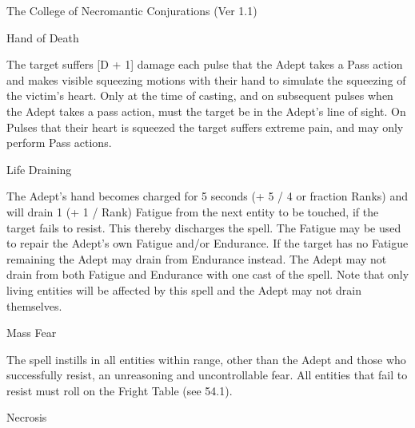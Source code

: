 \begin{Chapter}{The College of Necromantic Conjurations (Ver 1.1)}
\begin{spell}[S-6]{Hand of Death}

\begin{effects}
The target suffers [D + 1] damage each pulse that the Adept takes a
Pass action and makes visible squeezing motions with their hand to
simulate the squeezing of the victim’s heart. Only at the time of
casting, and on subsequent pulses when the Adept takes a pass action,
must the target be in the Adept’s line of sight.  On Pulses that their
heart is squeezed the target suffers extreme pain, and may only
perform Pass actions.
\end{effects}
\end{spell}

\begin{spell}[S-7]{Life Draining}

\begin{effects}
The Adept’s hand becomes charged for 5 seconds (+ 5 / 4 or fraction
Ranks) and will drain 1 (+ 1 / Rank) Fatigue from the next entity to
be touched, if the target fails to resist.  This thereby discharges
the spell.  The Fatigue may be used to repair the Adept’s own Fatigue
and/or Endurance.  If the target has no Fatigue remaining the Adept
may drain from Endurance instead. The Adept may not drain from both
Fatigue and Endurance with one cast of the spell. Note that only
living entities will be affected by this spell and the Adept may not
drain themselves.
\end{effects}
\end{spell}

\begin{spell}[S-8]{Mass Fear}

\begin{effects}
The spell instills in all entities within range, other than the Adept
and those who successfully resist, an unreasoning and uncontrollable
fear.  All entities that fail to resist must roll on the Fright Table
(see 54.1).
\end{effects}
\end{spell}

\begin{spell}[S-9]{Necrosis}


\end{spell}
\end{Chapter}
